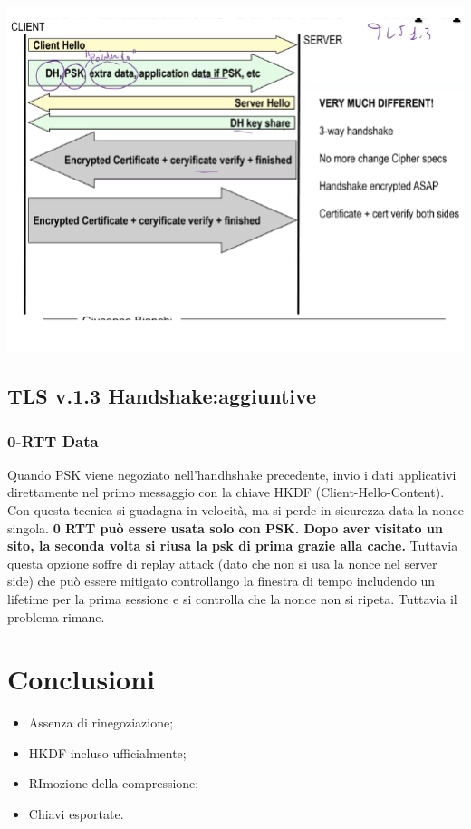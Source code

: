 \documentclass{book}
\theoremstyle{remark}
\begin{document}
\begin{center}
	\includegraphics[scale=0.6]{2021-12-11-18-37-34.png}
\end{center}
\subsection{TLS v\@.1\@.3 Handshake:\@Opzioni aggiuntive}
\subsubsection{0-RTT Data}
Quando PSK viene negoziato nell'handhshake precedente, invio i dati applicativi direttamente nel primo messaggio con la chiave HKDF (Client-Hello-Content)\@. Con questa tecnica si guadagna in velocità, ma si perde in sicurezza data la nonce singola\@. \textbf{0 RTT  può essere usata solo con PSK\@. Dopo aver visitato un sito, la seconda volta si riusa la psk di prima grazie alla cache\@.} Tuttavia questa opzione soffre di replay attack (dato che non si usa la nonce nel server side) che può essere mitigato controllango la finestra di tempo includendo un lifetime per la prima sessione e si controlla che la nonce non si ripeta\@. Tuttavia il problema rimane\@.
\section{Conclusioni}
\begin{itemize}
	\item Assenza di rinegoziazione;\@
	\item HKDF incluso ufficialmente;\@
	\item RImozione della compressione;\@
	\item Chiavi esportate\@.
\end{itemize}
\end{document}
